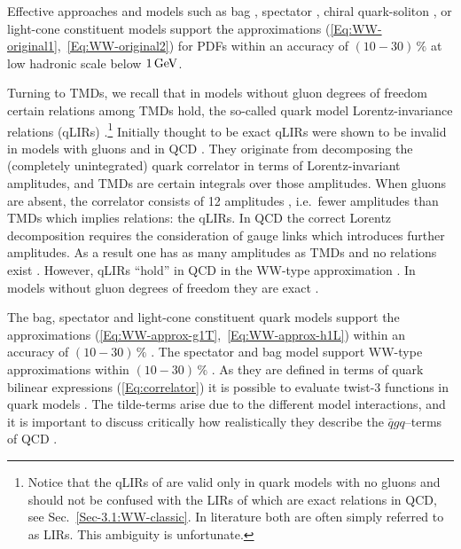 \documentclass[a4paper,11pt]{article}
\newcommand{\darkgreen}[1]{{\color{darkgreen} #1}}
\newcommand{\ms}[1]{\darkgreen{ #1}}
\begin{document}
Effective approaches and models such as bag 
\cite{Jaffe:1991ra,Stratmann:1993aw,Signal:1996ct,Avakian:2010br},
spectator \cite{Jakob:1997wg}, chiral quark-soliton 
\cite{Wakamatsu:2000ex}, or light-cone 
constituent \cite{Pasquini:2008ax,Lorce:2011dv} models
support the approximations (\ref{Eq:WW-original1},~\ref{Eq:WW-original2}) 
for PDFs within an accuracy of $(10-30)\,\%$ at low hadronic scale 
below $1\,{\rm GeV}$. 

Turning to TMDs, we recall that in models without gluon 
degrees of freedom certain relations among TMDs hold, the 
so-called quark model Lorentz-invariance relations (qLIRs)
\cite{Tangerman:1994bb,Mulders:1995dh}.\footnote{\ms{Notice that
	the qLIRs of \cite{Tangerman:1994bb,Mulders:1995dh} are 
	valid only in quark models with no gluons and should not
	be confused with the LIRs of \cite{Kanazawa:2015ajw} which 
	are exact relations in QCD, see Sec.~\ref{Sec-3.1:WW-classic}.
	In literature both are often simply referred to as LIRs.
	This ambiguity is unfortunate.}}
Initially thought to be exact \cite{Tangerman:1994bb,Mulders:1995dh}
qLIRs were shown  to be invalid in models with gluons 
\cite{Kundu:2001pk,Schlegel:2004rg} and in QCD \cite{Goeke:2003az}.
They originate from decomposing the (completely unintegrated)
quark correlator in terms of Lorentz-invariant amplitudes, and 
TMDs are certain integrals over those amplitudes.
When gluons are absent, the correlator consists
of 12 amplitudes \cite{Tangerman:1994bb,Mulders:1995dh}, i.e.\ fewer 
amplitudes than TMDs which implies relations: the qLIRs. 
In QCD the correct Lorentz decomposition requires the consideration of 
gauge links which introduces further amplitudes. As a result one has 
as many amplitudes as TMDs and no relations exist \cite{Goeke:2003az}. 
However, qLIRs ``hold'' in QCD in the WW-type approximation 
\cite{Metz:2008ib}. In models without gluon degrees of freedom 
they are exact
\cite{Metz:2008ib,Teckentrup:2009tk,Avakian:2010br,Jakob:1997wg}. 

The bag, spectator and light-cone constituent quark models support 
the approximations (\ref{Eq:WW-approx-g1T},~\ref{Eq:WW-approx-h1L}) 
within an accuracy of $(10-30)\,\%$ 
\cite{Jakob:1997wg,Pasquini:2008ax,Avakian:2010br,Lorce:2011dv}.
The spectator and bag model support WW-type approximations 
within $(10-30)\,\%$ \cite{Avakian:2010br}. 
As they are defined in terms of quark bilinear expressions 
(\ref{Eq:correlator}) it is possible to evaluate twist-3 functions
in quark models \cite{Jaffe:1991ra}. The tilde-terms arise due to
the different model interactions, and it is important to discuss
critically how realistically they describe the $\bar{q}gq$--terms
of QCD \cite{Lorce:2014hxa,Lorce:2016ugb}.
\end{document}
